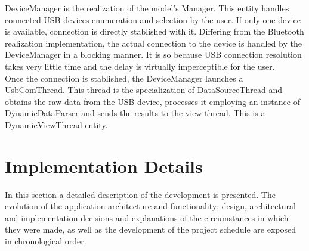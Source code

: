 			DeviceManager is the realization of the model's Manager. This entity handles connected USB devices enumeration and selection by the user. If only one device is available, connection is directly stablished with it. Differing from the Bluetooth realization implementation, the actual connection to the device is handled by the DeviceManager in a blocking manner. It is so because USB connection resolution takes very little time and the delay is virtually imperceptible for the user.\\

			Once the connection is stablished, the DeviceManager launches a UsbComThread. This thread is the specialization of DataSourceThread and obtains the raw data from the USB device, processes it employing an instance of DynamicDataParser and sends the results to the view thread. This is a DynamicViewThread entity.

	\section{Implementation Details}

		In this section a detailed description of the development is presented. The evolution of the application architecture and functionality; design, architectural and implementation decisions and explanations of the circumstances in which they were made, as well as the development of the project schedule are exposed in chronological order.\\

